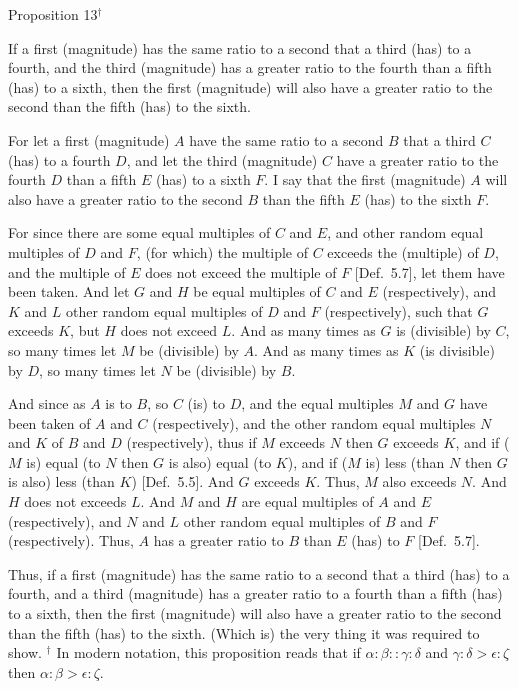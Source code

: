 
\begin{center}
{\large Proposition 13}$^\dag$
\end{center}

If a first (magnitude) has the same ratio to a second that a third (has) to a fourth, and the third (magnitude) has a greater ratio to the fourth than a fifth (has) to a sixth, then the first (magnitude) will also have a greater ratio to the
second  than the fifth (has) to the sixth.

\epsfysize=0.65in
\centerline{}

For let a first (magnitude) $A$ have the same ratio to a second $B$ that a
third $C$ (has) to a fourth $D$, and let the third (magnitude) $C$ have a
greater ratio to the fourth $D$  than a fifth $E$ (has) to a sixth $F$. I say that the first (magnitude) $A$
will also have a greater ratio to the second $B$ than the fifth $E$ (has) to the
sixth $F$.

For since there are some equal multiples of $C$ and $E$, and other random equal multiples of $D$ and $F$, (for which) the multiple of $C$ exceeds the (multiple) of $D$, 
and the multiple of $E$ does not exceed the multiple of $F$ [Def.~5.7], let them have been taken. And let
$G$ and $H$ be equal multiples of $C$ and $E$ (respectively), and $K$ and $L$
other random equal multiples of $D$ and $F$ (respectively), such that 
$G$ exceeds $K$, but $H$ does not exceed $L$. And as many times as $G$ is (divisible)
by $C$, so many times let $M$ be (divisible) by $A$. And as many times as
$K$ (is divisible) by $D$, so many times let $N$ be (divisible) by $B$.

And since as $A$ is to $B$, so $C$ (is) to $D$, and the equal multiples $M$ and $G$
have been taken of $A$ and $C$ (respectively), and the other random equal
multiples $N$ and $K$ of $B$ and $D$ (respectively), thus if $M$ exceeds $N$ then
$G$ exceeds $K$, and if ($M$ is) equal (to $N$ then $G$ is also) equal (to $K$),
and if ($M$ is) less (than $N$ then $G$ is also) less (than $K$) [Def.~5.5]. And $G$ exceeds $K$. Thus, $M$ also exceeds $N$.
And $H$ does not exceeds $L$. And $M$ and $H$ are equal multiples of
$A$ and $E$ (respectively), and $N$ and $L$ other random equal multiples of $B$ and $F$
(respectively).  Thus, $A$ has a greater ratio to $B$ than $E$ (has) to $F$  [Def.~5.7].

Thus, if a first (magnitude) has the same ratio to a second  that a third (has) to a fourth, and a third (magnitude) has a greater ratio to a fourth than a fifth (has) to a sixth, then the first (magnitude) will also have a greater ratio to the
second than the fifth (has) to the sixth. (Which is)
the very thing it was required to show.
{\footnotesize \noindent$^\dag$ In modern notation, this proposition
reads that if $\alpha:\beta::\gamma:\delta$ and $\gamma:\delta > \epsilon:\zeta$ then $\alpha:\beta>\epsilon:\zeta$.}

